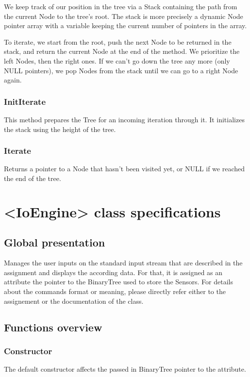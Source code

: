 \documentclass[10pt]{article}
\begin{document}
We keep track of our position in the tree via a Stack containing the path from the current Node to the tree's root. The stack is more precisely a dynamic Node pointer array with a variable keeping the current number of pointers in the array.

To iterate, we start from the root, push the next Node to be returned in the stack, and return the current Node at the end of the method. We prioritize the left Nodes, then the right ones. If we can't go down the tree any more (only NULL pointers), we pop Nodes from the stack until we can go to a right Node again.

\subsubsection*{InitIterate}
This method prepares the Tree for an incoming iteration through it. It initializes the stack using the height of the tree.

\subsubsection*{Iterate}
Returns a pointer to a Node that hasn't been visited yet, or NULL if we reached the end of the tree.

\section{<IoEngine> class specifications}
\subsection{Global presentation}
Manages the user inputs on the standard input stream that are described in the assignment and displays the according data. For that, it is assigned as an attribute the pointer to the BinaryTree used to store the Sensors. For details about the commands format or meaning, please directly refer either to the assignement or the documentation of the class.

\subsection{Functions overview}

\subsubsection*{Constructor}
The default constructor affects the passed in BinaryTree pointer to the attribute.
\end{document}
